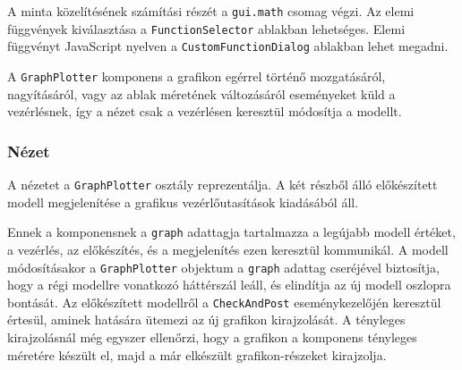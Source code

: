 A minta közelítésének számítási részét a \texttt{gui.math} csomag végzi.
Az elemi függvények kiválasztása a \texttt{FunctionSelector} ablakban lehetséges.
Elemi függvényt JavaScript nyelven a \texttt{CustomFunctionDialog} ablakban lehet megadni.

A \texttt{GraphPlotter} komponens a grafikon egérrel történő mozgatásáról, nagyításáról, vagy az ablak méretének változásáról eseményeket küld a vezérlésnek, így a nézet csak a vezérlésen keresztül módosítja a modellt.

\subsubsection{Nézet}

A nézetet a \texttt{GraphPlotter} osztály reprezentálja.
A két részből álló előkészített modell megjelenítése a grafikus vezérlőutasítások kiadásából áll.

Ennek a komponensnek a \texttt{graph} adattagja tartalmazza a legújabb modell értéket, a vezérlés, az előkészítés, és a megjelenítés ezen keresztül kommunikál.
A modell módosításakor a \texttt{GraphPlotter} objektum a \texttt{graph} adattag cseréjével biztosítja, hogy a régi modellre vonatkozó háttérszál leáll, és elindítja az új modell oszlopra bontását.
Az előkészített modellről a \texttt{CheckAndPost} eseménykezelőjén keresztül értesül, aminek hatására ütemezi az új grafikon kirajzolását.
A tényleges kirajzolásnál még egyszer ellenőrzi, hogy a grafikon a komponens tényleges méretére készült el, majd a már elkészült grafikon-részeket kirajzolja.

